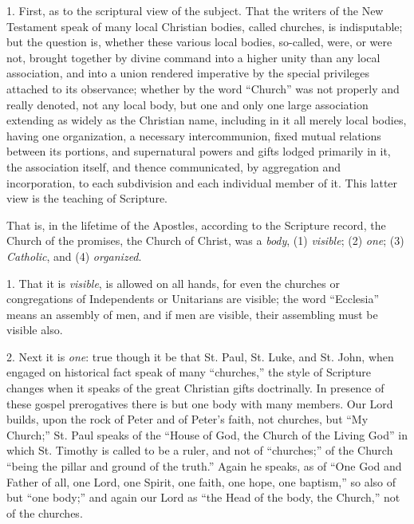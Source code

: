 1. First, as to the scriptural view of the subject. That the
writers of the New Testament speak of many local Christian bodies,
called churches, is indisputable; but the question is, whether these
various local bodies, so-called, were, or were not, brought
together by divine command into a higher unity than any local
association, and into a union rendered imperative by the special
privileges attached to its observance; whether by the word
``Church'' was not properly and really denoted, not any local
body, but one and only one large association extending as widely as
the Christian name, including in it all merely local bodies, having
one organization, a necessary intercommunion, fixed mutual relations
between its portions, and supernatural powers and gifts lodged
primarily in it, the association itself, and thence communicated, by
aggregation and incorporation, to each subdivision and each individual
member of it. This latter view is the teaching of Scripture.

That is, in the lifetime of the Apostles, according to the
Scripture record, the Church of the promises, the Church of Christ,
was a \emph{body}, (1) \emph{visible}; (2) \emph{one}; (3) \emph{Catholic},
and (4) \emph{organized}.

1. That it is \emph{visible}, is allowed on all hands, for even the
churches or congregations of Independents or Unitarians are visible;
the word ``Ecclesia'' means an assembly of men, and if men are
visible, their assembling must be visible also.

2. Next it is \emph{one}: true though it be that St. Paul, St.
Luke, and St. John, when engaged on historical fact speak of many
``churches,'' the style of Scripture changes when it speaks of
the great Christian gifts doctrinally. In presence of these gospel
prerogatives there is but one body with many members. Our Lord builds,
upon the rock of Peter and of Peter's faith, not churches, but
``My Church;'' St. Paul speaks of the ``House of God, the
Church of the Living God'' in which St. Timothy is called to be a
ruler, and not of ``churches;'' of the Church ``being the
pillar and ground of the truth.'' Again he speaks, as of
``One God and Father of all, one Lord, one Spirit, one faith, one
hope, one baptism,'' so also of but ``one body;'' and
again our Lord as ``the Head of the body, the Church,'' not of
the churches.

